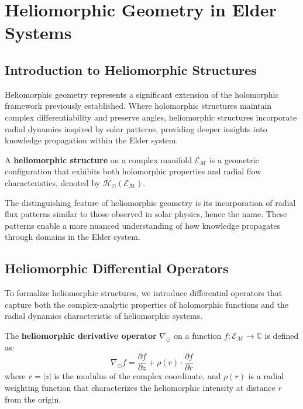 \chapter{Heliomorphic Geometry in Elder Systems}

\section{Introduction to Heliomorphic Structures}

Heliomorphic geometry represents a significant extension of the holomorphic framework previously established. Where holomorphic structures maintain complex differentiability and preserve angles, heliomorphic structures incorporate radial dynamics inspired by solar patterns, providing deeper insights into knowledge propagation within the Elder system.

\begin{definition}
A \textbf{heliomorphic structure} on a complex manifold $\mathcal{E}_{\mathcal{M}}$ is a geometric configuration that exhibits both holomorphic properties and radial flow characteristics, denoted by $\mathcal{H}_{\odot}(\mathcal{E}_{\mathcal{M}})$.
\end{definition}

The distinguishing feature of heliomorphic geometry is its incorporation of radial flux patterns similar to those observed in solar physics, hence the name. These patterns enable a more nuanced understanding of how knowledge propagates through domains in the Elder system.

\section{Heliomorphic Differential Operators}

To formalize heliomorphic structures, we introduce differential operators that capture both the complex-analytic properties of holomorphic functions and the radial dynamics characteristic of heliomorphic systems.

\begin{definition}
The \textbf{heliomorphic derivative operator} $\nabla_{\odot}$ on a function $f: \mathcal{E}_{\mathcal{M}} \rightarrow \mathbb{C}$ is defined as:
\begin{equation}
\nabla_{\odot} f = \frac{\partial f}{\partial z} + \rho(r) \cdot \frac{\partial f}{\partial r}
\end{equation}
where $r = |z|$ is the modulus of the complex coordinate, and $\rho(r)$ is a radial weighting function that characterizes the heliomorphic intensity at distance $r$ from the origin.
\end{definition}

